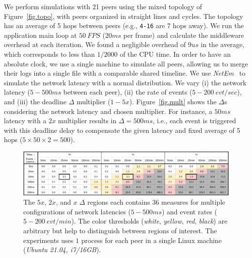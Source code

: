 \documentclass[12pt]{article}
\newcommand{\code}[1]  {\texttt{\small{#1}}}
\begin{document}
We perform simulations with 21 peers using the mixed topology of
Figure~\ref{fig.topo}, with peers organized in straight lines and cycles.
The topology has an average of 5 hops between peers (e.g., \code{4-16} are 7
hops away).
%
We run the application main loop at $50~FPS$ ($20ms$ per frame) and calculate
the middleware overhead at each iteration.
We found a negligible overhead of $9us$ in the average, which corresponds to
less than $1/2000$ of the CPU time.
%
In order to have an absolute clock, we use a single machine to simulate all
peers, allowing us to merge their logs into a single file with a comparable
shared timeline.
%
We use \emph{NetEm}~\cite{netem} to simulate the network latency with a normal
distribution.
%
We vary
    (i)   the network latency ($5-500ms$ between each peer),
    (ii)  the rate of events ($5-200~evt/sec$), and
    (iii) the deadline $\Delta$ multiplier ($1-5x$).
%
Figure~\ref{fig.mult} shows the $\Delta$s considering the network latency and
chosen multiplier.
For instance, a $50ms$ latency with a $2x$ multiplier results in
$\Delta=500ms$, i.e., each event is triggered with this deadline delay to
compensate the given latency and fixed average of 5 hops
($5 \times 50 \times 2 = 500$).

\begin{figure}[t]
  \centering
  \includegraphics[width=\linewidth]{baks}
  \caption{
    \label{fig.baks}
The $5x$, $2x$, and $x$ $\Delta$ regions each contains $36$ measures for
multiple configurations of network latencies ($5-500ms$) and event rates
($5-200~evt/min$).
%
The color thresholds (\emph{white}, \emph{yellow}, \emph{red}, \emph{black})
are arbitrary but help to distinguish between regions of interest.
%
The experiments uses $1$ process for each peer in a single Linux machine
(\emph{Ubuntu 21.04, i7/16GB}).
    }
\end{figure}
\end{document}
